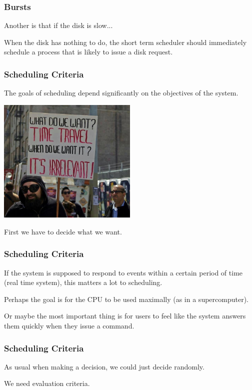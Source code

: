 \begin{frame}
\frametitle{Bursts}


Another is that if the disk is slow...

When the disk has nothing to do, the short term scheduler should immediately schedule a process that is likely to issue a disk request.
\end{frame}



\begin{frame}
\frametitle{Scheduling Criteria}

The goals of scheduling depend significantly on the objectives of the system. 

\begin{center}
	\includegraphics[width=0.5\textwidth]{images/timetravel.jpg}
\end{center}

First we have to decide what we want.

\end{frame}



\begin{frame}
\frametitle{Scheduling Criteria}
If the system is supposed to respond to events within a certain period of time (real time system), this matters a lot to scheduling. 

Perhaps the goal is for the CPU to be used maximally (as in a supercomputer). 

Or maybe the most important thing is for users to feel like the system answers them quickly when they issue a command.


\end{frame}

\begin{frame}
\frametitle{Scheduling Criteria}

As usual when making a decision, we could just decide randomly. 

We need evaluation criteria.

\end{frame}


